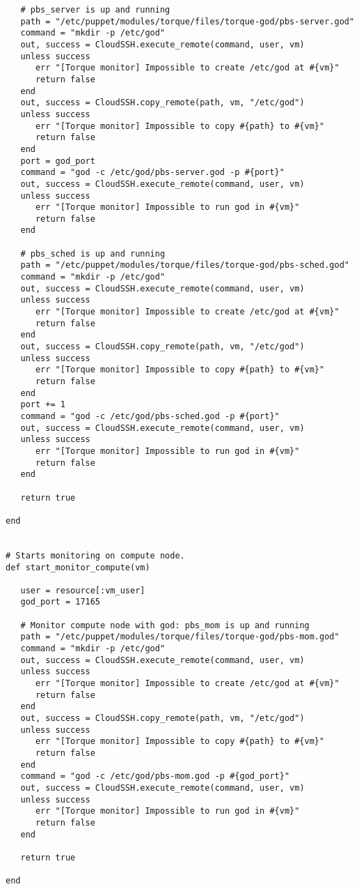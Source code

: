 \begin{lstlisting}
   # pbs_server is up and running
   path = "/etc/puppet/modules/torque/files/torque-god/pbs-server.god"
   command = "mkdir -p /etc/god"
   out, success = CloudSSH.execute_remote(command, user, vm)
   unless success
      err "[Torque monitor] Impossible to create /etc/god at #{vm}"
      return false
   end
   out, success = CloudSSH.copy_remote(path, vm, "/etc/god")
   unless success
      err "[Torque monitor] Impossible to copy #{path} to #{vm}"
      return false
   end
   port = god_port
   command = "god -c /etc/god/pbs-server.god -p #{port}"
   out, success = CloudSSH.execute_remote(command, user, vm)
   unless success
      err "[Torque monitor] Impossible to run god in #{vm}"
      return false
   end
   
   # pbs_sched is up and running
   path = "/etc/puppet/modules/torque/files/torque-god/pbs-sched.god"
   command = "mkdir -p /etc/god"
   out, success = CloudSSH.execute_remote(command, user, vm)
   unless success
      err "[Torque monitor] Impossible to create /etc/god at #{vm}"
      return false
   end
   out, success = CloudSSH.copy_remote(path, vm, "/etc/god")
   unless success
      err "[Torque monitor] Impossible to copy #{path} to #{vm}"
      return false
   end
   port += 1
   command = "god -c /etc/god/pbs-sched.god -p #{port}"
   out, success = CloudSSH.execute_remote(command, user, vm)
   unless success
      err "[Torque monitor] Impossible to run god in #{vm}"
      return false
   end
   
   return true

end


# Starts monitoring on compute node.
def start_monitor_compute(vm)
   
   user = resource[:vm_user]
   god_port = 17165
   
   # Monitor compute node with god: pbs_mom is up and running
   path = "/etc/puppet/modules/torque/files/torque-god/pbs-mom.god"
   command = "mkdir -p /etc/god"
   out, success = CloudSSH.execute_remote(command, user, vm)
   unless success
      err "[Torque monitor] Impossible to create /etc/god at #{vm}"
      return false
   end
   out, success = CloudSSH.copy_remote(path, vm, "/etc/god")
   unless success
      err "[Torque monitor] Impossible to copy #{path} to #{vm}"
      return false
   end
   command = "god -c /etc/god/pbs-mom.god -p #{god_port}"
   out, success = CloudSSH.execute_remote(command, user, vm)
   unless success
      err "[Torque monitor] Impossible to run god in #{vm}"
      return false
   end
   
   return true

end
\end{lstlisting}


